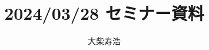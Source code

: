 \theoremstyle{mystyle}
\newtheorem{AXM}{公理}%
\newtheorem{DFN}[AXM]{定義}
\newtheorem{THM}[AXM]{定理}
\newtheorem*{THM*}{定理}
\newtheorem{PRP}[AXM]{命題}
\newtheorem{LMM}[AXM]{補題}
\newtheorem{CRL}[AXM]{系}
\newtheorem{EG}[AXM]{例}
\newtheorem*{EG*}{例}
\newtheorem{RMK}[AXM]{注意}
\newtheorem{CNV}[AXM]{約束}
\newtheorem{CMT}[AXM]{コメント}
\newtheorem*{CMT*}{コメント}
\newtheorem{NTN}[AXM]{記号}


\usepackage{framed}
\renewenvironment{leftbar}{%
  \def\FrameCommand{\textcolor{lightgray}{\vrule width 4pt} \hspace{10pt}}%
  \MakeFramed {\advance\hsize-\width \FrameRestore}}%
{\endMakeFramed}
\newenvironment{redleftbar}{%
  \def\FrameCommand{\textcolor{lightgray}{\vrule width 1pt} \hspace{10pt}}%
  \MakeFramed {\advance\hsize-\width \FrameRestore}}%
 {\endMakeFramed}



\renewcommand{\Re}{\mathop{\mathrm{Re}}\nolimits}







\def\inner<#1>{\langle #1 \rangle}








\title{2024/03/28 セミナー資料}
\author{大柴寿浩}
\date{}


